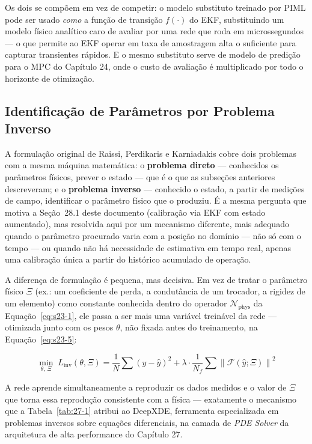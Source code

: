 \documentclass[12pt,a4paper]{article}
\numberwithin{equation}{section}
\numberwithin{table}{section}
\numberwithin{figure}{section}
\begin{document}
{	Os dois se compõem em vez de competir: o modelo substituto treinado por PIML pode ser usado \textit{como} a função de transição $f(\cdot)$ do EKF, substituindo um modelo físico analítico caro de avaliar por uma rede que roda em microssegundos — o que permite ao EKF operar em taxa de amostragem alta o suficiente para capturar transientes rápidos. E o mesmo substituto serve de modelo de predição para o MPC do Capítulo 24, onde o custo de avaliação é multiplicado por todo o horizonte de otimização.

	\subsection{Identificação de Parâmetros por Problema Inverso}

	A formulação original de Raissi, Perdikaris e Karniadakis \cite{piml} cobre dois problemas com a mesma máquina matemática: o \textbf{problema direto} — conhecidos os parâmetros físicos, prever o estado — que é o que as subseções anteriores descreveram; e o \textbf{problema inverso} — conhecido o estado, a partir de medições de campo, identificar o parâmetro físico que o produziu. É a mesma pergunta que motiva a Seção~28.1 deste documento (calibração via EKF com estado aumentado), mas resolvida aqui por um mecanismo diferente, mais adequado quando o parâmetro procurado varia com a posição no domínio — não só com o tempo — ou quando não há necessidade de estimativa em tempo real, apenas uma calibração única a partir do histórico acumulado de operação.

	A diferença de formulação é pequena, mas decisiva. Em vez de tratar o parâmetro físico $\Xi$ (ex.: um coeficiente de perda, a condutância de um trocador, a rigidez de um elemento) como constante conhecida dentro do operador $\mathcal{N}_{\text{phys}}$ da Equação~\eqref{eq:s23-1}, ele passa a ser mais uma variável treinável da rede — otimizada junto com os pesos $\theta$, não fixada antes do treinamento, na Equação~\eqref{eq:s23-5}:

	\begin{equation}\label{eq:s23-5}
	\min_{\theta,\, \Xi} \; L_{\text{inv}}(\theta, \Xi) = \frac{1}{N}\sum (y-\hat{y})^2 + \lambda \cdot \frac{1}{N_f}\sum \left\| \mathcal{F}(\hat{y}; \Xi) \right\|^2
	\end{equation}

	A rede aprende simultaneamente a reproduzir os dados medidos e o valor de $\Xi$ que torna essa reprodução consistente com a física — exatamente o mecanismo que a Tabela~\ref{tab:27-1} atribui ao DeepXDE, ferramenta especializada em problemas inversos sobre equações diferenciais, na camada de \textit{PDE Solver} da arquitetura de alta performance do Capítulo 27.

}
\end{document}
